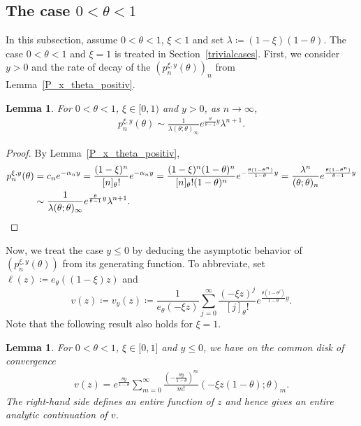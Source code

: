 \documentclass[10pt,a4paper]{amsart}
\newcommand{\1}{\mathds{1}}
\newtheorem{Lemma}[definition]{Lemma}
\begin{document}
\subsection{The case \texorpdfstring{$0<\theta<1$}{0<theta<1}}\label{sec_thetale1}
In this subsection, assume $0<\theta<1$, $\xi<1$ and set $\lambda\coloneqq (1-\xi)(1-\theta)$. The case $0<\theta<1$ and $\xi=1$ is treated in Section~\ref{trivialcases}. First, we consider $y>0$ and the rate of decay of the $(p_n^{\xi,y}(\theta))_n$ from Lemma~\ref{P_x_theta_positiv}.
\begin{Lemma}\label{asymptotic_pos_theta_pos_y}
  For $0<\theta<1$, $\xi\in[0,1)$ and $y>0$, as  $n\to\infty$,
    \begin{align*}
        p_n^{\xi,y}(\theta)\sim \frac{1}{\lambda(\theta;\theta)_\infty}e^{\frac{\theta}{\theta-1}y}\lambda^{n+1}.
    \end{align*}
 \end{Lemma}
\begin{proof}
 By Lemma~\ref{P_x_theta_positiv},
    \begin{align*}
        p_n^{\xi,y}(\theta)
        &=c_ne^{-\alpha_ny}
        =\frac{(1-\xi)^n}{[n]_\theta!}e^{-\alpha_ny}=\frac{(1-\xi)^n(1-\theta)^n}{[n]_\theta!(1-\theta)^n}e^{-\frac{\theta(1-\theta^n)}{1-\theta}y}
        =\frac{\lambda^n}{(\theta;\theta)_n}e^{\frac{\theta(1-\theta^n)}{\theta-1}y}
        \\&\sim\frac{1}{\lambda(\theta;\theta)_\infty}e^{\frac{\theta}{\theta-1}y}\lambda^{n+1}.\qedhere
    \end{align*}
\end{proof}
Now, we treat the case $y\le0$ by deducing the asymptotic behavior of $(p_n^{\xi,y}(\theta))$ from its generating function.
To abbreviate, set 
$\ell(z)\coloneqq e_\theta((1-\xi)z)$ and 
$$v(z)\coloneqq v_y(z)\coloneqq  \frac{1}{e_\theta(-\xi z)}\sum_{j=0}^\infty \frac{(-\xi z)^{j}}{[j]_\theta!}e^{\frac{\theta(1-\theta^j)}{1-\theta}y}.$$
Note that the following result also holds for $\xi=1$.
\begin{Lemma}\label{singularities_pos_theta}
   For $0<\theta<1$, $\xi\in\big[0,1]$ and $y\le 0$, we have on the common disk of convergence
   \begin{align}\label{repr_v_thetale1}
    v(z)=e^{\frac{\theta y}{1-\theta}}\sum_{m=0}^\infty\frac{\left(-\frac{\theta y}{1-\theta}\right)^m}{m!}(-\xi z(1-\theta);\theta)_m.
\end{align}
The right-hand side defines an entire function of $z$ and hence gives an entire analytic continuation of $v$.
\end{Lemma}
\end{document}
